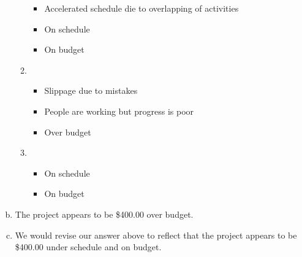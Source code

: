 \documentclass[letterpaper,10pt]{article}
\begin{document}
\begin{enumerate}[a.]
\begin{enumerate}[A]
\begin{itemize}
\item Accelerated schedule die to overlapping of activities
\item On schedule
\item On budget
\end{itemize}
\item \
\begin{itemize}
\item Slippage due to mistakes
\item People are working but progress is poor
\item Over budget
\end{itemize}
\item \
\begin{itemize}
\item On schedule
\item On budget
\end{itemize}
\end{enumerate}
\item The project appears to be \$400.00 over budget.
\item We would revise our answer above to reflect that the project appears to be \$400.00 under schedule and on budget.
\end{enumerate}
\end{document}
